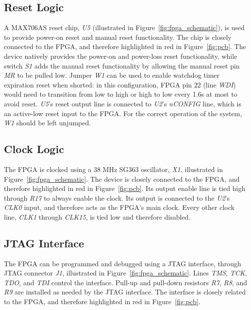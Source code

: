 \documentclass[titlepage]{scrartcl}
\begin{document}
	\clearpage

	

	\clearpage

	\subsection{Reset Logic}
	A MAX706AS reset chip, \textit{U5} (illustrated in Figure~\ref{fig:fpga_schematic}), is used to provide power-on reset and manual reset functionality. The chip is closely connected to the FPGA, and therefore highlighted in red in Figure~\ref{fig:pcb}. The device natively provides the power-on and power-loss reset functionality, while switch \textit{S1} adds the manual reset functionality by allowing the manual reset pin \textit{MR} to be pulled low. Jumper \textit{W1} can be used to enable watchdog timer expiration reset when shorted: in this configuration, FPGA pin 22 (line \textit{WDI}) would need to transition from low to high or high to low every 1.6s at most to avoid reset. \textit{U5}'s reset output line is connected to \textit{U2}'s \textit{nCONFIG} line, which is an active-low reset input to the FPGA. For the correct operation of the system, \textit{W1} should be left unjumped.\\

	\subsection{Clock Logic}
	The FPGA is clocked using a 38 MHz SG363 oscillator, \textit{X1}, illustrated in Figure~\ref{fig:fpga_schematic}. The device is closely connected to the FPGA, and therefore highlighted in red in Figure~\ref{fig:pcb}. Its output enable line is tied high through \textit{R17} to always enable the clock. Its output is connected to the \textit{U2}'s \textit{CLK0} input, and therefore acts as the FPGA's main clock. Every other clock line, \textit{CLK1} through \textit{CLK15}, is tied low and therefore disabled.\\

	\subsection{JTAG Interface}
	The FPGA can be programmed and debugged using a JTAG interface, through JTAG connector \textit{J1}, illustrated in Figure~\ref{fig:fpga_schematic}. Lines \textit{TMS}, \textit{TCK}, \textit{TDO}, and \textit{TDI} control the interface. Pull-up and pull-down resistors \textit{R7}, \textit{R8}, and \textit{R9} are installed as needed by the JTAG interface. The interface is closely related to the FPGA, and therefore highlighted in red in Figure~\ref{fig:pcb}.\\
\end{document}
